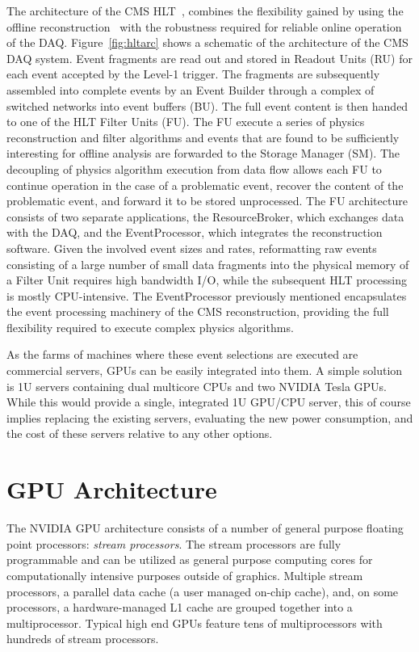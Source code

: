 \documentclass{JINST}
\begin{document}
The architecture of the CMS HLT~\cite{Sphicas:2002gg},\cite{Sakulin:2007rj} combines the flexibility gained by using the offline
reconstruction~\cite{bib:datamodel} with the robustness required for reliable online operation of the DAQ. Figure~\ref{fig:hltarc} shows 
a schematic of the architecture of the CMS DAQ system. Event fragments are read out and stored in Readout Units (RU) for each event accepted
by the Level-1 trigger. The fragments are subsequently assembled into complete events by an Event Builder through a complex of switched 
networks into event buffers (BU). The full event content is then handed to one of the HLT Filter Units (FU). The FU execute a series of 
physics reconstruction and filter algorithms and events that are found to be sufficiently interesting for offline analysis are forwarded 
to the Storage Manager (SM). The decoupling of physics algorithm execution from data flow allows each FU to continue operation in the case of a problematic event, recover the
content of the problematic event, and forward it to be stored unprocessed. The FU architecture consists of 
two separate applications, the ResourceBroker, which exchanges data with the DAQ, and the EventProcessor, which integrates the reconstruction
software. Given the involved event sizes and rates, reformatting raw events consisting of a large number of small data fragments into the physical 
memory of a Filter Unit requires high bandwidth I/O, while the subsequent HLT processing is mostly CPU-intensive.
The EventProcessor previously mentioned encapsulates the event processing machinery of the CMS reconstruction, providing the full flexibility 
required to execute complex physics algorithms. 

As the farms of machines where these event selections are executed are commercial servers, GPUs can be easily integrated into them.
A simple solution is 1U servers containing dual multicore CPUs and two NVIDIA Tesla GPUs. 
While this would provide a single, integrated 1U GPU/CPU server, this of course implies replacing the existing servers, 
evaluating the new power consumption, and the cost of these servers relative to any other options.

\section{GPU Architecture}

The NVIDIA GPU architecture consists of a
number of general purpose floating point processors: {\it stream processors}.
The stream processors are fully programmable and can be utilized as general
purpose computing cores for computationally intensive purposes outside of graphics.
Multiple stream processors, a parallel data cache (a user managed
on-chip cache), and, on some processors, a hardware-managed L1 cache are
grouped together into a multiprocessor.  Typical high end GPUs feature tens
of multiprocessors with hundreds of stream processors.
\end{document}

